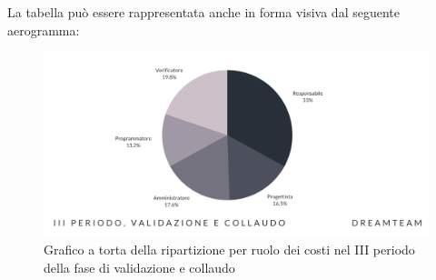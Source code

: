 La tabella può essere rappresentata anche in forma visiva dal seguente aerogramma:
\begin{figure}[!h]
\centering
\includegraphics[scale=0.65]{Sezioni/SezioniPreventivo/grafici/Validazione_III_periodo_costi.png}
\caption{Grafico a torta della ripartizione per ruolo dei costi nel III periodo della fase di validazione e collaudo}
\end{figure}




